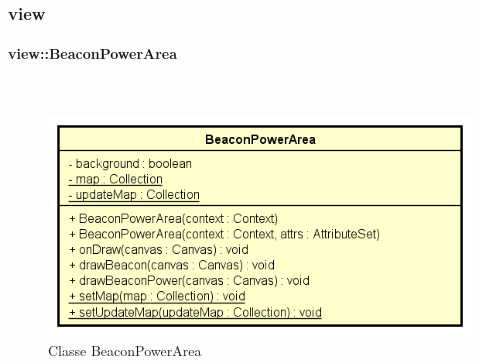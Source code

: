\documentclass[../DefinizioneDiProdotto.tex]{subfiles}
\begin{document}
\subsubsection{view}

\paragraph{view::BeaconPowerArea}
\
\begin{figure}[H]
	\centering
	\includegraphics[width=\maxwidth]{img/BeaconPowerArea.png}
	\caption{Classe BeaconPowerArea}\label{fig:view::BeaconPowerArea} 
\end{figure}
\end{document}
